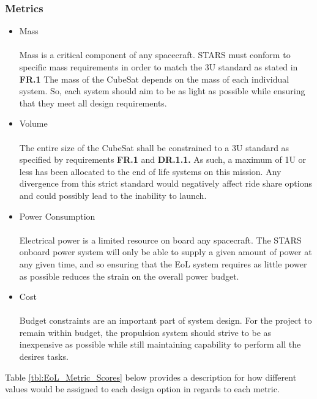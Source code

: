 \documentclass[3p]{elsarticle}
\begin{document}
\subsubsection{Metrics}
\begin{itemize}
\item Mass\\
\\
Mass is a critical component of any spacecraft. STARS must conform to specific mass requirements in order to match the 3U standard as stated in \textbf{FR.1} The mass of the CubeSat depends on the mass of each individual system. So, each system should aim to be as light as possible while ensuring that they meet all design requirements. 
\item{Volume} \\
\\
The entire size of the CubeSat shall be constrained to a 3U standard as specified by requirements \textbf{FR.1}  and  \textbf{DR.1.1.}  As  such,  a maximum  of  1U  or  less  has  been  allocated  to  the  end  of  life  systems on  this mission. Any  divergence  from  this  strict  standard  would  negatively  affect  ride  share options  and  could possibly lead to the inability to launch. 

\item{Power Consumption} \\
\\
Electrical power is a limited resource on board any spacecraft. The STARS onboard power system will only be able to supply a given amount of power at any given time, and so ensuring that the EoL system requires as little power as possible reduces the strain on the overall power budget.
\item{Cost} \\
\\
Budget constraints are an important part of system design. For the project to remain within budget, the propulsion system should strive to be as inexpensive as possible while still maintaining capability to perform all the desires tasks.  
\end{itemize}

Table \ref{tbl:EoL_Metric_Scores} below provides a description for how different values would be assigned to each design option in regards to each metric. 
\end{document}

